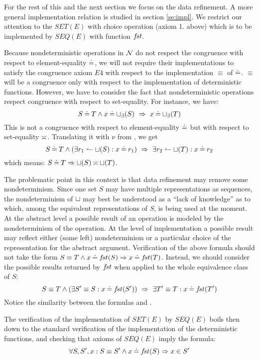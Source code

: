 For the rest of this and the next section we focus on the data refinement. A more general implementation relation is studied in section \ref{se:impl}. We restrict our attention to the $SET(E)$ with choice operation (axiom 1. above) which is to be implemented by $SEQ(E)$ with function $f\!st$. 

Because nondeterministic operations in $\cal N$ do not respect the congruence with respect to element-equality $\mathbin{\doteq}$, we will not require their implementations to
satisfy the congruence axiom $E4$ with respect to the implementation $\equiv$ of
$\mathbin{\doteq}$.
$\equiv$ will be a congruence only with respect to the implementation of deterministic functions.
However, we have to consider the fact that nondeterministic operations respect
congruence with respect to set-equality. For instance, we have: 
\[ S\mathbin{\doteq} T\land x\mathbin{\doteq} \sqcup_\exists(S)\ \mathrel\Rightarrow\ x\mathbin{\doteq} \sqcup_\exists(T) \] 
This is not a congruence with respect to element-equality $\mathbin{\doteq}$ but with respect
to
set-equality $\mathbin{\asymp}$. Translating it with $\nu$ from , we get
\begin{equation}\label{eq:setcong}
S\Eq T\land (\exists r_1\isres\ch(S):x\Eq r_1)\ \impl\ 
\exists r_2\isres\ch(T): x\Eq r_2
\end{equation}
which means: $S\mathbin{\doteq} T \mathrel\Rightarrow \sqcup(S)\mathbin{\asymp}\sqcup(T)$. 

The problematic point in this context is that data refinement may remove some nondeterminism. Since one set $S$ may have multiple representations as sequences, the nondeterminism of $\sqcup$ may best be understood as a ``lack of knowledge'' as to which, among the equivalent representations of $S$, is being
used at the moment. At the abstract level a possible result of an operation is modeled by the nondeterminism of the operation. At the level of implementation a possible result may reflect either (some left) nondeterminism or a particular choice of the representation for the abstract argument.
Verification of the above formula should not take the form \(S\equiv T\land x\mathbin{\doteq} f\!st(S)\mathrel\Rightarrow x\mathbin{\doteq} f\!st(T)\). Instead, we should consider the
possible results returned by $f\!st$ when applied to the whole equivalence class
of $S$:
\begin{equation}\label{eq:seqcong}
S\equiv T\land (\exists S'\equiv S: x\mathbin{\doteq} f\!st(S'))\ \mathrel\Rightarrow\ \exists T'\equiv T : x\mathbin{\doteq} f\!st(T')
\end{equation}
Notice the similarity between the formulas  and .

The verification of the implementation of $SET(E)$ by $SEQ(E)$ boils then down to the standard verification of the implementation of the deterministic
functions, and checking that axioms of $SEQ(E)$ imply the formula: \[\forall S,S',x:S\equiv S'\land x\mathbin{\doteq} f\!st(S)\mathrel\Rightarrow x\in S'\] 

